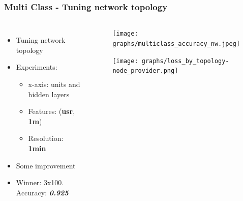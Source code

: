 \documentclass[aspectratio=169,11pt,hyperref={colorlinks=true}]{beamer}
\begin{document}
\begin{frame}
    \frametitle{Multi Class - Tuning network topology}
    \begin{columns}
        \begin{itemize}
            \item{Tuning network topology}
            \item{Experiments:}
            \begin{itemize}
              \item{x-axis: units and hidden layers}
              \item{Features: (\textbf{usr}, \textbf{1m})}
              \item{Resolution: \textbf{1min}}
            \end{itemize}
            \item{Some improvement}
            \item{Winner: 3x100. Accuracy: \emph{\textbf{0.925}}}
        \end{itemize}
        \begin{center}
        \begin{figure}
          \texttt{[image: graphs/multiclass\_accuracy\_nw.jpeg]}
        \end{figure}
        \begin{figure}
          \texttt{[image: graphs/loss\_by\_topology-node\_provider.png]}
        \end{figure}
        \end{center}
  \end{columns}
\end{frame}
\end{document}
